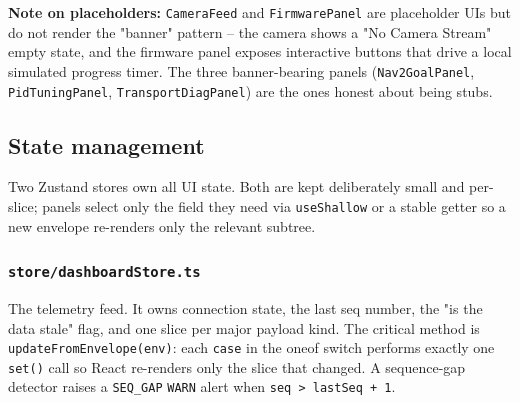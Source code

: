 \noindent\textbf{Note on placeholders:} \texttt{CameraFeed} and
\texttt{FirmwarePanel} are placeholder UIs but do not render the
"banner" pattern -- the camera shows a "No Camera Stream" empty state,
and the firmware panel exposes interactive buttons that drive a local
simulated progress timer. The three banner-bearing panels
(\texttt{Nav2GoalPanel}, \texttt{PidTuningPanel},
\texttt{TransportDiagPanel}) are the ones honest about being stubs.

\subsection{State management}

Two Zustand stores own all UI state. Both are kept deliberately small
and per-slice; panels select only the field they need via
\texttt{useShallow} or a stable getter so a new envelope re-renders only
the relevant subtree.

\subsubsection{\texttt{store/dashboardStore.ts}}

The telemetry feed. It owns connection state, the last seq number, the
"is the data stale" flag, and one slice per major payload kind. The
critical method is \texttt{updateFromEnvelope(env)}: each \texttt{case}
in the oneof switch performs exactly one \texttt{set()} call so React
re-renders only the slice that changed. A sequence-gap detector raises
a \texttt{SEQ\_GAP} \texttt{WARN} alert when \texttt{seq > lastSeq + 1}.

